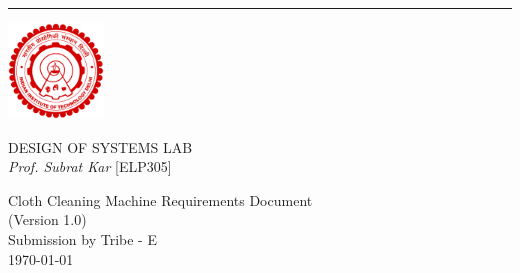 \documentclass[12pt]{article}
\date{}
\def\myversion{1.0}
\begin{document}
\begin{center}
    
    \rule{16cm}{5pt}\vskip1cm
    \begin{bfseries}
    \begin{center}
        \includegraphics[width=1in]{Images/iitd_logo.png}
    \end{center}

        \Huge{DESIGN OF SYSTEMS LAB }\\
        \textit{Prof. Subrat Kar} [ELP305] 
        \vspace{2cm}
        \begin{figure}[H]
        \centering

        \end{figure}
        \vspace{0.5cm}
        Cloth Cleaning Machine
        Requirements Document\\
        \LARGE{(Version \myversion)}\\
        \vspace{4.5cm}
        Submission by Tribe - E\\
        \today\\
    \end{bfseries}
\end{center}
\newpage
\tableofcontents
\newpage



\listoffigures

\listoftables
\newpage
\end{document}
